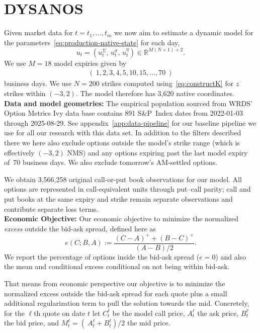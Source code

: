 \documentclass[11pt,a4paper]{article}
\newcommand{\R}{\mathbb{R}}
\begin{document}
\section{DYSANOS}
\label{sec:data}

Given market data for $t=t_1,\ldots,t_m$ we now aim to estimate a dynamic model
for the parameters~\eqref{eq:production-native-state} for each day,
\begin{equation}
  u_t=\left(
u_t^{\Sigma},\,
            u_t^{\sigma},\,
      u_t^{\eta}
      \right)
  \in\R^{M(N+1)+2}.
\end{equation}
We use $M=18$ model expiries given by
\begin{align*}
    (\ 1,2,3,4,5,10,15,\ldots,70\ )
\end{align*}
business days.
We use $N=200$ strikes computed using~\eqref{eq:constructK} for $z$ strikes within $(-3,2)$.
The model therefore has 3,620 native
coordinates.  \\

\noindent
\textbf{Data and model geometries:}
The empirical population sourced from WRDS' Option Metrics Ivy data base contains 891 S\&P~Index dates from 2022-01-03 through
2025-08-29. See appendix~\ref{app:data-pipeline} for our baseline pipeline we use for all our research with this data set.
In addition to the filters described there we here also exclude options outside the model's strike range (which is effectively $(-3,2)$ NMS) and any options expiring
past the last model expiry of~70 business days. We also exclude tomorrow's AM-settled options.

We obtain 3,566,258 original call-or-put book observations for our model.
All options are represented in call-equivalent units through put–call parity; call and put books at the
same expiry and strike remain separate observations and contribute separate loss terms.\\

\noindent
\textbf{Economic Objective:}
Our economic objective to minimize the normalized \emph{excess} outside the bid-ask spread, defined here as
\begin{equation}
  e(C;B,A)
  :=\frac{(C-A)^+ +(B-C)^+}{(A-B)/2}.
  \label{eq:half-spread-excess-preview}
\end{equation}
We report the percentage of options inside the bid-ask spread ($e=0$) and also the mean and conditional excess conditional
on not being within bid-ask.

That means from economic perspective our objective is to minimize the normalized excess outside the bid-ask spread for each quote plus a small
additional regularization term to pull the solution towards the mid. Concretely,
for the $\ell$th quote on date $t$ let $C_t^\ell$ be the model call price, $A^\ell_t$ the ask price, $B^\ell_t$ the bid price, and
$M_t^\ell=(\ A_t^\ell+ B_t^\ell)/2$ the mid price.
\end{document}
